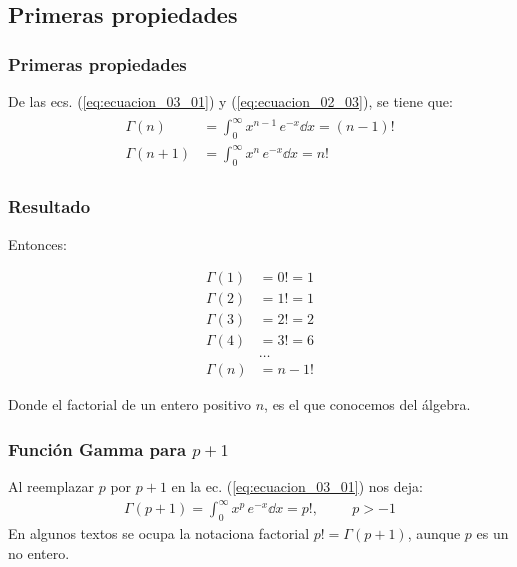 \subsection{Primeras propiedades}
\begin{frame}
\frametitle{Primeras propiedades}
De las ecs. (\ref{eq:ecuacion_03_01}) y (\ref{eq:ecuacion_02_03}), se tiene que:
\begin{align}
\begin{aligned}
\Gamma (n) &= \int_{0}^{\infty} x^{n-1} \, e^{-x} \dd{x} = (n -1)! \\[1em]
\Gamma (n+1) &= \int_{0}^{\infty} x^{n} \, e^{-x} \dd{x} = n!
\end{aligned}
\label{eq:ecuacion_03_02}
\end{align}
\end{frame}
\begin{frame}
\frametitle{Resultado}
Entonces:
\\
\begin{minipage}{0.3\linewidth}
\begin{align*}
\Gamma (1) &= 0! = 1 \\
\Gamma (2) &= 1! = 1 \\
\Gamma (3) &= 2! = 2 \\
\Gamma (4) &= 3! = 6 \\
&\ldots \\
\Gamma (n) &= n-1!
\end{align*}
\end{minipage}
\hspace{0.7cm}
\pause
\begin{minipage}{0.5\linewidth}
Donde el factorial de un entero positivo $n$, es el que conocemos del álgebra.
\end{minipage}
\end{frame}
\begin{frame}
\frametitle{Función Gamma para $p+1$}
Al reemplazar $p$ por $p+1$ en la ec. (\ref{eq:ecuacion_03_01}) nos deja:
\begin{align}
\Gamma (p+1) = \int_{0}^{\infty} x^{p} \, e^{-x} \dd{x} = p!, \hspace{1cm} p > -1
\label{eq:ecuacion_03_03}
\end{align}
\pause
En algunos textos se ocupa la notaciona factorial $p! = \Gamma (p+1)$, aunque $p$ es un no entero.
\end{frame}
